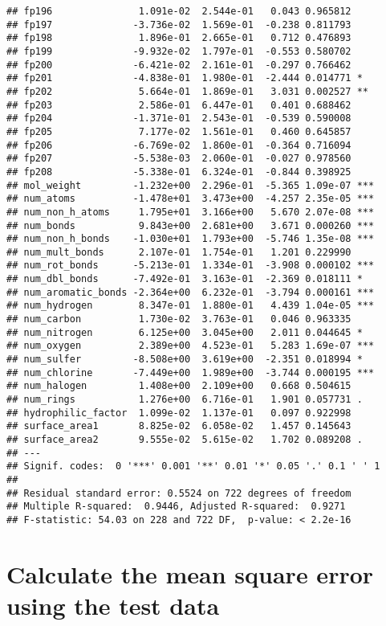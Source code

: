 \documentclass[]{article}
\begin{document}
\begin{verbatim}
## fp196               1.091e-02  2.544e-01   0.043 0.965812    
## fp197              -3.736e-02  1.569e-01  -0.238 0.811793    
## fp198               1.896e-01  2.665e-01   0.712 0.476893    
## fp199              -9.932e-02  1.797e-01  -0.553 0.580702    
## fp200              -6.421e-02  2.161e-01  -0.297 0.766462    
## fp201              -4.838e-01  1.980e-01  -2.444 0.014771 *  
## fp202               5.664e-01  1.869e-01   3.031 0.002527 ** 
## fp203               2.586e-01  6.447e-01   0.401 0.688462    
## fp204              -1.371e-01  2.543e-01  -0.539 0.590008    
## fp205               7.177e-02  1.561e-01   0.460 0.645857    
## fp206              -6.769e-02  1.860e-01  -0.364 0.716094    
## fp207              -5.538e-03  2.060e-01  -0.027 0.978560    
## fp208              -5.338e-01  6.324e-01  -0.844 0.398925    
## mol_weight         -1.232e+00  2.296e-01  -5.365 1.09e-07 ***
## num_atoms          -1.478e+01  3.473e+00  -4.257 2.35e-05 ***
## num_non_h_atoms     1.795e+01  3.166e+00   5.670 2.07e-08 ***
## num_bonds           9.843e+00  2.681e+00   3.671 0.000260 ***
## num_non_h_bonds    -1.030e+01  1.793e+00  -5.746 1.35e-08 ***
## num_mult_bonds      2.107e-01  1.754e-01   1.201 0.229990    
## num_rot_bonds      -5.213e-01  1.334e-01  -3.908 0.000102 ***
## num_dbl_bonds      -7.492e-01  3.163e-01  -2.369 0.018111 *  
## num_aromatic_bonds -2.364e+00  6.232e-01  -3.794 0.000161 ***
## num_hydrogen        8.347e-01  1.880e-01   4.439 1.04e-05 ***
## num_carbon          1.730e-02  3.763e-01   0.046 0.963335    
## num_nitrogen        6.125e+00  3.045e+00   2.011 0.044645 *  
## num_oxygen          2.389e+00  4.523e-01   5.283 1.69e-07 ***
## num_sulfer         -8.508e+00  3.619e+00  -2.351 0.018994 *  
## num_chlorine       -7.449e+00  1.989e+00  -3.744 0.000195 ***
## num_halogen         1.408e+00  2.109e+00   0.668 0.504615    
## num_rings           1.276e+00  6.716e-01   1.901 0.057731 .  
## hydrophilic_factor  1.099e-02  1.137e-01   0.097 0.922998    
## surface_area1       8.825e-02  6.058e-02   1.457 0.145643    
## surface_area2       9.555e-02  5.615e-02   1.702 0.089208 .  
## ---
## Signif. codes:  0 '***' 0.001 '**' 0.01 '*' 0.05 '.' 0.1 ' ' 1
## 
## Residual standard error: 0.5524 on 722 degrees of freedom
## Multiple R-squared:  0.9446, Adjusted R-squared:  0.9271 
## F-statistic: 54.03 on 228 and 722 DF,  p-value: < 2.2e-16
\end{verbatim}

\section{Calculate the mean square error using the test
data}\label{calculate-the-mean-square-error-using-the-test-data}
\end{document}
